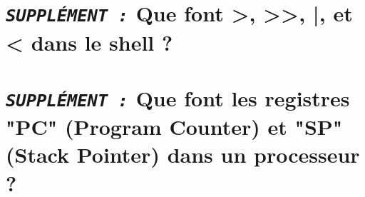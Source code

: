 \documentclass[11pt,a4paper]{article}
\begin{document}
\bigskip
\bigskip
\bigskip

\section{\textit{\texttt{SUPPL\'EMENT :}} Que font >, >{}>, |, et < dans le shell ?}

\bigskip
\bigskip
\bigskip
\bigskip
\bigskip
\bigskip
\bigskip

\section{\textit{\texttt{SUPPL\'EMENT :}} Que font les registres "PC" (Program Counter) et "SP" (Stack Pointer) dans un processeur ?}

\bigskip
\end{document}
